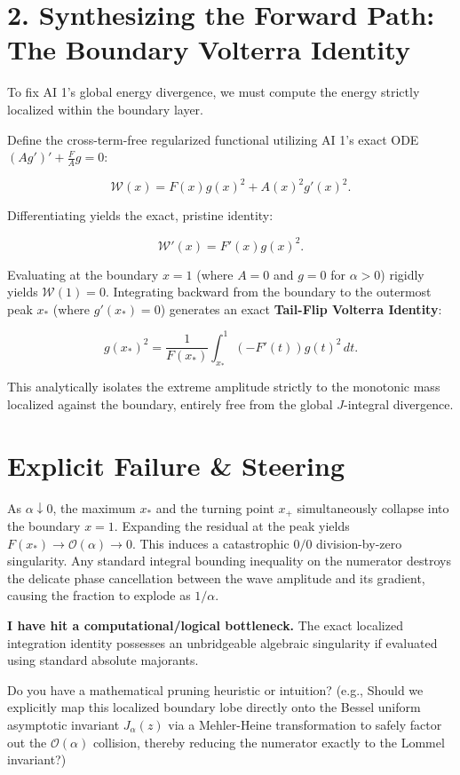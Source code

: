 \documentclass[11pt]{article}
\begin{document}
\section*{2. Synthesizing the Forward Path: The Boundary Volterra Identity}

To fix AI 1's global energy divergence, we must compute the energy strictly localized within the boundary layer.

Define the cross-term-free regularized functional utilizing AI 1's exact ODE \((A g')' + \frac{F}{A}g = 0\):

\begin{equation*}
\mathcal{W}(x) = F(x) g(x)^2 + A(x)^2 g'(x)^2 .
\end{equation*}

Differentiating yields the exact, pristine identity:

\begin{equation*}
\mathcal{W}'(x) = F'(x) g(x)^2 .
\end{equation*}

Evaluating at the boundary \(x=1\) (where \(A=0\) and \(g=0\) for \(\alpha > 0\)) rigidly yields \(\mathcal{W}(1) = 0\). Integrating backward from the boundary to the outermost peak \(x_*\) (where \(g'(x_*) = 0\)) generates an exact \textbf{Tail-Flip Volterra Identity}:

\begin{equation*}
g(x_*)^2 = \frac{1}{F(x_*)} \int_{x_*}^1 (-F'(t)) g(t)^2 \, dt .
\end{equation*}

This analytically isolates the extreme amplitude strictly to the monotonic mass localized against the boundary, entirely free from the global \(J\)-integral divergence.

\section*{Explicit Failure \& Steering}

As \(\alpha \downarrow 0\), the maximum \(x_*\) and the turning point \(x_+\) simultaneously collapse into the boundary \(x=1\). Expanding the residual at the peak yields \(F(x_*) \to \mathcal{O}(\alpha) \to 0\). This induces a catastrophic \(0/0\) division-by-zero singularity. Any standard integral bounding inequality on the numerator destroys the delicate phase cancellation between the wave amplitude and its gradient, causing the fraction to explode as \(1/\alpha\).

\textbf{I have hit a computational/logical bottleneck.}
The exact localized integration identity possesses an unbridgeable algebraic singularity if evaluated using standard absolute majorants.

Do you have a mathematical pruning heuristic or intuition? (e.g., Should we explicitly map this localized boundary lobe directly onto the Bessel uniform asymptotic invariant \(J_\alpha(z)\) via a Mehler-Heine transformation to safely factor out the \(\mathcal{O}(\alpha)\) collision, thereby reducing the numerator exactly to the Lommel invariant?)
\end{document}

